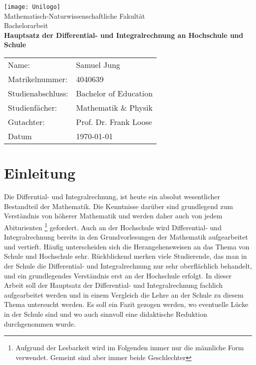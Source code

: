 \documentclass[a4paper]{article}
\begin{document}
\begin{titlepage}
\begin{center}
\texttt{[image: Unilogo]} \\
\vspace{2cm}
\Large Mathematisch-Naturwissenschaftliche Fakultät \\
\vspace{1cm}
\Large Bachelorarbeit \\
\vspace{1cm}
\huge \textbf{Hauptsatz der Differential- und Integralrechnung an Hochschule und Schule} \\
\vspace{3cm}
\large
\begin{tabular}{ll}
Name: & {Samuel Jung} \\
Matrikelnummer: & {4040639} \\
Studienabschluss: & {Bachelor of Education} \\
Studienfächer: & {Mathematik \& Physik} \\
Gutachter: & {Prof. Dr. Frank Loose} \\
Datum & {\today}
\end{tabular}
\end{center}
\end{titlepage}
\tableofcontents	
\newpage
\section{Einleitung}
Die Differntial- und Integralrechnung, ist heute ein absolut wesentlicher Bestandteil der Mathematik. Die Kenntnisse darüber sind grundlegend zum Verständnis von höherer Mathematik und werden daher auch von jedem Abiturienten \footnote{Aufgrund der Lesbarkeit wird im Folgenden immer nur die männliche Form verwendet. Gemeint sind aber immer beide Geschlechter} gefordert. Auch an der Hochschule wird Differential- und Integralrechnung bereits in den Grundvorlesungen der Mathematik aufgearbeitet und vertieft. Häufig unterscheiden sich die Herangehensweisen an das Thema von Schule und Hochschule sehr. Rückblickend merken viele Studierende, das man in der Schule die Differential- und Integralrechnung nur sehr oberflächlich behandelt, und ein grundlegendes Verständnis erst an der Hochschule erfolgt. In dieser Arbeit soll der Hauptsatz der Differential- und Integralrechnung fachlich aufgearbeitet werden und in einem Vergleich die Lehre an der Schule zu diesem Thema untersucht werden. Es soll ein Fazit gezogen werden, wo eventuelle Lücke in der Schule sind und wo auch sinnvoll eine didaktische Reduktion durchgenommen wurde. 
\end{document}
